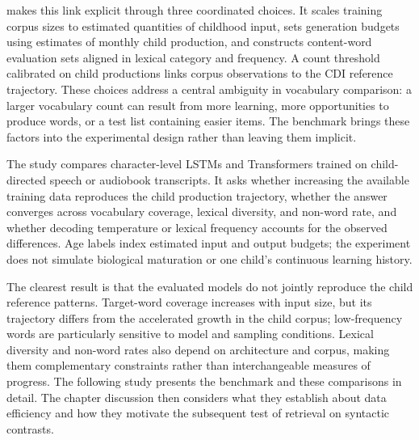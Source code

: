 \meCDI{} makes this link explicit through three coordinated choices. It scales training corpus sizes to estimated quantities of childhood input, sets generation budgets using estimates of monthly child production, and constructs content-word evaluation sets aligned in lexical category and frequency. A count threshold calibrated on child productions links corpus observations to the CDI reference trajectory. These choices address a central ambiguity in vocabulary comparison: a larger vocabulary count can result from more learning, more opportunities to produce words, or a test list containing easier items. The benchmark brings these factors into the experimental design rather than leaving them implicit.

The study compares character-level LSTMs and Transformers trained on child-directed speech or audiobook transcripts. It asks whether increasing the available training data reproduces the child production trajectory, whether the answer converges across vocabulary coverage, lexical diversity, and non-word rate, and whether decoding temperature or lexical frequency accounts for the observed differences. Age labels index estimated input and output budgets; the experiment does not simulate biological maturation or one child's continuous learning history.

The clearest result is that the evaluated models do not jointly reproduce the child reference patterns. Target-word coverage increases with input size, but its trajectory differs from the accelerated growth in the child corpus; low-frequency words are particularly sensitive to model and sampling conditions. Lexical diversity and non-word rates also depend on architecture and corpus, making them complementary constraints rather than interchangeable measures of progress. The following study presents the benchmark and these comparisons in detail. The chapter discussion then considers what they establish about data efficiency and how they motivate the subsequent test of retrieval on syntactic contrasts.
